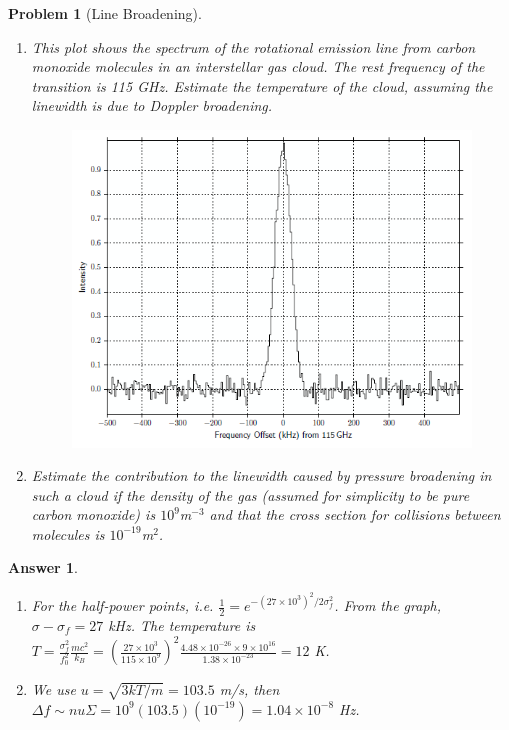 \documentclass[a4paper]{article}
\newtheorem{ans}{Answer}[section]
\theoremstyle{new}
\newtheorem{qns}{Problem}[section]
\begin{document}
\begin{qns}[Line Broadening]\leavevmode
\begin{enumerate}[label=(\alph*)]
\item This plot shows the spectrum of the rotational emission line from carbon monoxide molecules in an interstellar gas cloud. The rest frequency of the transition is 115 GHz. Estimate the temperature of the cloud, assuming the linewidth is due to Doppler broadening.
\begin{figure}[H]
    \centering
    \includegraphics[scale=0.7]{2_27.PNG}
\end{figure}
\item Estimate the contribution to the linewidth caused by pressure broadening in such a cloud if the
density of the gas (assumed for simplicity to be pure carbon monoxide) is $10^9$m$^{-3}$ and that the cross section for collisions between molecules is $10^{-19}$m$^2$.
\end{enumerate}
\end{qns}
\begin{ans}\leavevmode
\begin{enumerate}[label=(\alph*)]
\item For the half-power points, i.e. $\frac{1}{2}=e^{-(27\times10^3)^2/2\sigma_f^2}$. From the graph, $\sigma-\sigma_f=27$ kHz. The temperature is $T=\frac{\sigma_f^2}{f_0^2}\frac{mc^2}{k_B}=(\frac{27\times10^3}{115\times10^9})^2\frac{4.48\times10^{-26}\times 9\times10^{16}}{1.38\times10^{-23}}=12$ K.
\item We use $u=\sqrt{3kT/m}=103.5$ m/s, then $\Delta f\sim nu\Sigma=10^9(103.5)(10^{-19})=1.04\times10^{-8}$ Hz.
\end{enumerate}
\end{ans}
\end{document}
